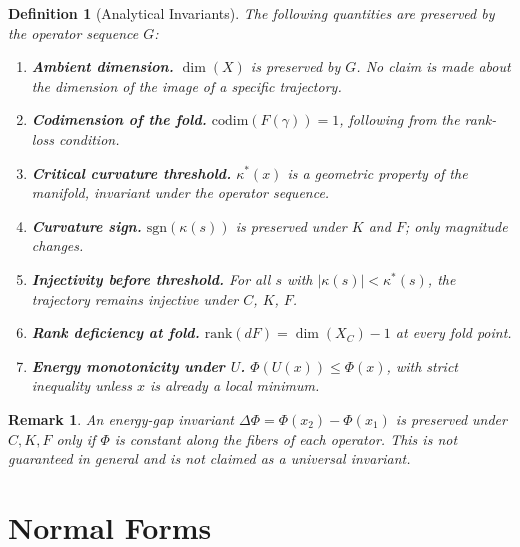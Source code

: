 \documentclass[12pt,a4paper]{article}
\newtheorem{definition}{Definition}[section]
\newtheorem{remark}{Remark}[section]
\begin{document}
\begin{definition}[Analytical Invariants]
The following quantities are preserved by the operator sequence $G$:

\begin{enumerate}[label=\textbf{I\arabic*.},leftmargin=3em]
  \item \textbf{Ambient dimension.}
    $\dim(X)$ is preserved by $G$.
    No claim is made about the dimension of the image of a specific
    trajectory.

  \item \textbf{Codimension of the fold.}
    $\mathrm{codim}(F(\gamma)) = 1$, following from the rank-loss
    condition.

  \item \textbf{Critical curvature threshold.}
    $\kappa^*(x)$ is a geometric property of the manifold, invariant
    under the operator sequence.

  \item \textbf{Curvature sign.}
    $\mathrm{sgn}(\kappa(s))$ is preserved under $K$ and $F$; only
    magnitude changes.

  \item \textbf{Injectivity before threshold.}
    For all $s$ with $|\kappa(s)| < \kappa^*(s)$, the trajectory
    remains injective under $C$, $K$, $F$.

  \item \textbf{Rank deficiency at fold.}
    $\mathrm{rank}(dF) = \dim(X_C) - 1$ at every fold point.

  \item \textbf{Energy monotonicity under $U$.}
    $\Phi(U(x)) \leq \Phi(x)$, with strict inequality unless $x$ is
    already a local minimum.
\end{enumerate}
\end{definition}

\begin{remark}
An energy-gap invariant $\Delta\Phi = \Phi(x_2) - \Phi(x_1)$ is
preserved under $C, K, F$ only if $\Phi$ is constant along the fibers
of each operator.
This is not guaranteed in general and is not claimed as a universal
invariant.
\end{remark}

\section{Normal Forms}
\label{sec:normalforms}
\end{document}
